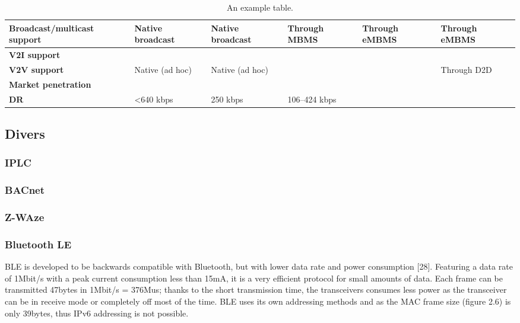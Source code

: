 \begin{table}[h!]
\begin{tabulary}{\columnwidth}{L|L|L|L|L|L}
	\bf{Broadcast/multicast support} & Native broadcast                                      & Native broadcast                                      & Through MBMS                     & Through eMBMS            & Through eMBMS             \\\hline
	\bf{V2I support}                 & \ok                                                   & \ok                                                   & \ok                              & \ok                      & \ok                       \\\hline
	\bf{V2V support}                 & Native (ad hoc)                                       & Native (ad hoc)                                       & \ko                              & \ko                      & Through D2D               \\\hline
	\bf{Market penetration}          & \ok                                                   & \ko                                                   & \ok                              & \ok                      & \ok                       \\\hline
	\bf{\ac{DR}}                   & <640 kbps                                        & 250 kbps                                              & 106–424 kbps                              & \ok                      & \ok                       \\\hline
	\end{tabulary}
	\caption{\label{tab:Tableppp} An example table.}
\end{table}




\subsection{Divers}
\subsubsection{IPLC}
\subsubsection{BACnet}
\subsubsection{Z-WAze}
\subsubsection{Bluetooth LE}
BLE is developed to be backwards compatible with Bluetooth,
	but with lower data rate and power consumption [28].
Featuring a data rate of 1Mbit/s with a peak current consumption less than 15mA,
	it is a very efficient protocol for small amounts of data.
Each frame can be transmitted 47bytes in 1Mbit/s = 376Mus;
	thanks to the short transmission time,
	the transceivers consumes less power as the transceiver can be in receive mode or completely off most of the time.
BLE uses its own addressing methods and as the MAC frame size (figure 2.6) is only 39bytes,
	thus IPv6 addressing is not possible.

